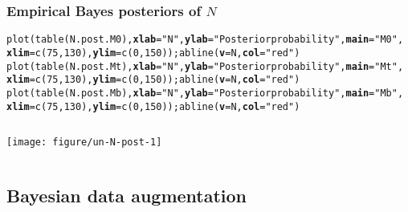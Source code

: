 \documentclass[color=usenames,dvipsnames]{beamer}\usepackage[]{graphicx}\usepackage[]{color}
\makeatletter
\newcommand{\hlnum}[1]{\textcolor[rgb]{0.69,0.494,0}{#1}}%
\newcommand{\hlstr}[1]{\textcolor[rgb]{0.749,0.012,0.012}{#1}}%
\newcommand{\hlstd}[1]{\textcolor[rgb]{0,0,0}{#1}}%
\newcommand{\hlkwc}[1]{\textcolor[rgb]{0,0,0}{\textbf{#1}}}%
\newcommand{\hlkwd}[1]{\textcolor[rgb]{0.004,0.004,0.506}{#1}}%
\newenvironment{kframe}{%
 \def\at@end@of@kframe{}%
 \ifinner\ifhmode%
  \def\at@end@of@kframe{\end{minipage}}%
  \begin{minipage}{\columnwidth}%
 \fi\fi%
 \def\FrameCommand##1{\hskip\@totalleftmargin \hskip-\fboxsep
 \colorbox{shadecolor}{##1}\hskip-\fboxsep
     \hskip-\linewidth \hskip-\@totalleftmargin \hskip\columnwidth}%
 \MakeFramed {\advance\hsize-\width
   \@totalleftmargin\z@ \linewidth\hsize
   \@setminipage}}%
 {\par\unskip\endMakeFramed%
 \at@end@of@kframe}
\newenvironment{knitrout}{}{} %
\makeatother
\begin{document}
\begin{frame}[fragile]
  \frametitle{Empirical Bayes posteriors of $N$}
\begin{knitrout}\tiny
{}\color{fgcolor}\begin{kframe}
\begin{alltt}
\hlkwd{plot}\hlstd{(}\hlkwd{table}\hlstd{(N.post.M0),} \hlkwc{xlab}\hlstd{=}\hlstr{"N"}\hlstd{,} \hlkwc{ylab}\hlstd{=}\hlstr{"Posterior probability"}\hlstd{,} \hlkwc{main}\hlstd{=}\hlstr{"M0"}\hlstd{,}
     \hlkwc{xlim}\hlstd{=}\hlkwd{c}\hlstd{(}\hlnum{75}\hlstd{,} \hlnum{130}\hlstd{),} \hlkwc{ylim}\hlstd{=}\hlkwd{c}\hlstd{(}\hlnum{0}\hlstd{,}\hlnum{150}\hlstd{));} \hlkwd{abline}\hlstd{(}\hlkwc{v}\hlstd{=N,} \hlkwc{col}\hlstd{=}\hlstr{"red"}\hlstd{)}
\hlkwd{plot}\hlstd{(}\hlkwd{table}\hlstd{(N.post.Mt),} \hlkwc{xlab}\hlstd{=}\hlstr{"N"}\hlstd{,} \hlkwc{ylab}\hlstd{=}\hlstr{"Posterior probability"}\hlstd{,} \hlkwc{main}\hlstd{=}\hlstr{"Mt"}\hlstd{,}
     \hlkwc{xlim}\hlstd{=}\hlkwd{c}\hlstd{(}\hlnum{75}\hlstd{,} \hlnum{130}\hlstd{),} \hlkwc{ylim}\hlstd{=}\hlkwd{c}\hlstd{(}\hlnum{0}\hlstd{,}\hlnum{150}\hlstd{));} \hlkwd{abline}\hlstd{(}\hlkwc{v}\hlstd{=N,} \hlkwc{col}\hlstd{=}\hlstr{"red"}\hlstd{)}
\hlkwd{plot}\hlstd{(}\hlkwd{table}\hlstd{(N.post.Mb),} \hlkwc{xlab}\hlstd{=}\hlstr{"N"}\hlstd{,} \hlkwc{ylab}\hlstd{=}\hlstr{"Posterior probability"}\hlstd{,} \hlkwc{main}\hlstd{=}\hlstr{"Mb"}\hlstd{,}
     \hlkwc{xlim}\hlstd{=}\hlkwd{c}\hlstd{(}\hlnum{75}\hlstd{,} \hlnum{130}\hlstd{),} \hlkwc{ylim}\hlstd{=}\hlkwd{c}\hlstd{(}\hlnum{0}\hlstd{,}\hlnum{150}\hlstd{));} \hlkwd{abline}\hlstd{(}\hlkwc{v}\hlstd{=N,} \hlkwc{col}\hlstd{=}\hlstr{"red"}\hlstd{)}
\end{alltt}
\end{kframe}
\end{knitrout}
  \begin{columns}
    \begin{column}{\paperwidth}
      \texttt{[image: figure/un-N-post-1]}
    \end{column}
  \end{columns}
\end{frame}





\subsection{Bayesian data augmentation}

\end{document}
